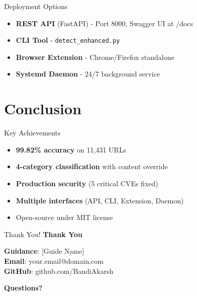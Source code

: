 \documentclass[10pt, aspectratio=169]{beamer}
\begin{document}
\begin{frame}{Deployment Options}
    \begin{itemize}
        \item \textbf{REST API} (FastAPI) - Port 8000, Swagger UI at /docs
        \item \textbf{CLI Tool} - \texttt{detect\_enhanced.py}
        \item \textbf{Browser Extension} - Chrome/Firefox standalone
        \item \textbf{Systemd Daemon} - 24/7 background service
    \end{itemize}
\end{frame}

\section{Conclusion}

\begin{frame}{Key Achievements}
    \begin{itemize}
        \item \textbf{99.82\% accuracy} on 11,431 URLs
        \item \textbf{4-category classification} with content override
        \item \textbf{Production security} (5 critical CVEs fixed)
        \item \textbf{Multiple interfaces} (API, CLI, Extension, Daemon)
        \item Open-source under MIT license
    \end{itemize}
\end{frame}

\begin{frame}{Thank You!}
    \centering
    \Huge \textbf{Thank You}
    
    \vspace{1cm}
    \large
    \textbf{Guidance}: [Guide Name] \\
    \textbf{Email}: your.email@domain.com \\
    \textbf{GitHub}: github.com/BandiAkarsh
    
    \vspace{1cm}
    \textbf{Questions?}
\end{frame}
\end{document}
